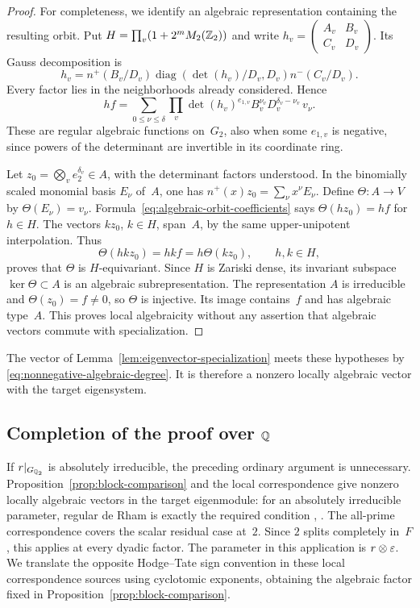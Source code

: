 \begin{proof}
For completeness, we identify an algebraic representation containing
the resulting orbit.  Put
$H=\prod_v(1+2^mM_2(\mathbb Z_2))$ and write
$h_v=\left(\begin{smallmatrix}A_v&B_v\\C_v&D_v\end{smallmatrix}\right)$.
Its Gauss decomposition is
\[
 h_v=n^+(B_v/D_v)
       \operatorname{diag}(\det(h_v)/D_v,D_v)n^-(C_v/D_v).
\]
Every factor lies in the neighborhoods already considered.  Hence
\begin{equation}\label{eq:algebraic-orbit-coefficients}
 hf=\sum_{0\le\nu\le\delta}
       \prod_v\det(h_v)^{e_{1,v}}
               B_v^{\nu_v}D_v^{\delta_v-\nu_v}\,v_\nu.
\end{equation}
These are regular algebraic functions on~$G_2$, also when some
$e_{1,v}$ is negative, since powers of the determinant are invertible
in its coordinate ring.

Let $z_0=\bigotimes_ve_2^{\delta_v}\in A$, with the determinant
factors understood.  In the binomially scaled monomial basis $E_\nu$
of~$A$, one has $n^+(x)z_0=\sum_\nu x^\nu E_\nu$.
Define $\Theta:A\to V$ by $\Theta(E_\nu)=v_\nu$.
Formula~\eqref{eq:algebraic-orbit-coefficients} says
$\Theta(hz_0)=hf$ for $h\in H$.
The vectors $kz_0$, $k\in H$, span~$A$, by the same upper-unipotent
interpolation.  Thus
\[
 \Theta(hkz_0)=hkf=h\Theta(kz_0),\qquad h,k\in H,
\]
proves that $\Theta$ is $H$-equivariant.  Since $H$ is Zariski dense,
its invariant subspace $\ker\Theta\subset A$ is an algebraic
subrepresentation.  The representation $A$ is irreducible and
$\Theta(z_0)=f\ne0$, so $\Theta$ is injective.  Its image contains~$f$
and has algebraic type~$A$.  This proves local
algebraicity without any assertion that algebraic vectors commute
with specialization.
\end{proof}

The vector of Lemma~\ref{lem:eigenvector-specialization} meets these
hypotheses by \eqref{eq:nonnegative-algebraic-degree}.  It is therefore
a nonzero locally algebraic vector with the target eigensystem.

\subsection{Completion of the proof over \texorpdfstring{$\mathbb Q$}{Q}}

If $r|_{G_{\mathbb Q_2}}$ is absolutely irreducible, the preceding ordinary
argument is unnecessary.  Proposition~\ref{prop:block-comparison}
and the local correspondence give nonzero locally algebraic vectors
in the target eigenmodule: for an absolutely irreducible parameter,
regular de Rham is exactly the required condition
\cite[Theorems~1.1 and~1.3]{CDP2014},
\cite[Theorem~0.20]{Colmez2010}.  The all-prime correspondence covers
the scalar residual case at~$2$.  Since $2$ splits completely in~$F$,
this applies at every dyadic factor.
The parameter in this application is $r\otimes\varepsilon$.  We translate
the opposite Hodge--Tate sign convention in these local correspondence
sources using cyclotomic exponents, obtaining the algebraic factor fixed
in Proposition~\ref{prop:block-comparison}.

